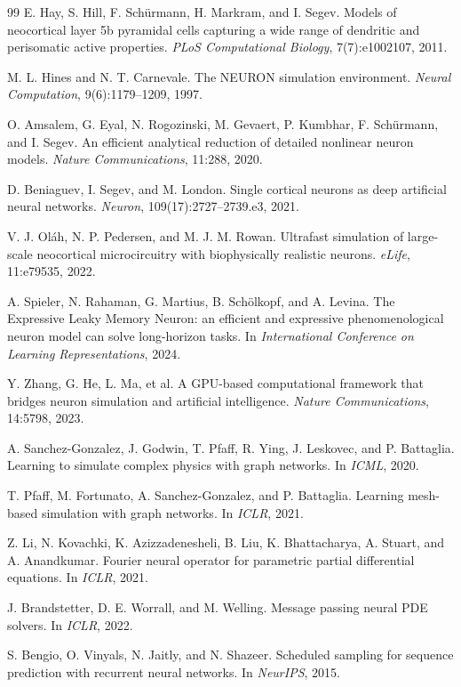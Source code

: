 \documentclass[11pt]{article}
\begin{document}
\begin{thebibliography}{99}
 E. Hay, S. Hill, F. Sch\"urmann, H. Markram, and I. Segev.
Models of neocortical layer 5b pyramidal cells capturing a wide range of
dendritic and perisomatic active properties. \emph{PLoS Computational
Biology}, 7(7):e1002107, 2011.

 M. L. Hines and N. T. Carnevale. The NEURON simulation
environment. \emph{Neural Computation}, 9(6):1179--1209, 1997.

 O. Amsalem, G. Eyal, N. Rogozinski, M. Gevaert,
P. Kumbhar, F. Sch\"urmann, and I. Segev. An efficient analytical reduction of
detailed nonlinear neuron models. \emph{Nature Communications}, 11:288, 2020.

 D. Beniaguev, I. Segev, and M. London. Single cortical
neurons as deep artificial neural networks. \emph{Neuron},
109(17):2727--2739.e3, 2021.

 V. J. Ol\'ah, N. P. Pedersen, and M. J. M. Rowan. Ultrafast
simulation of large-scale neocortical microcircuitry with biophysically
realistic neurons. \emph{eLife}, 11:e79535, 2022.

 A. Spieler, N. Rahaman, G. Martius, B. Sch\"olkopf, and
A. Levina. The Expressive Leaky Memory Neuron: an efficient and expressive
phenomenological neuron model can solve long-horizon tasks. In
\emph{International Conference on Learning Representations}, 2024.

 Y. Zhang, G. He, L. Ma, et al. A GPU-based computational
framework that bridges neuron simulation and artificial intelligence.
\emph{Nature Communications}, 14:5798, 2023.

 A. Sanchez-Gonzalez, J. Godwin, T. Pfaff, R. Ying,
J. Leskovec, and P. Battaglia. Learning to simulate complex physics with graph
networks. In \emph{ICML}, 2020.

 T. Pfaff, M. Fortunato, A. Sanchez-Gonzalez, and
P. Battaglia. Learning mesh-based simulation with graph networks. In
\emph{ICLR}, 2021.

 Z. Li, N. Kovachki, K. Azizzadenesheli, B. Liu,
K. Bhattacharya, A. Stuart, and A. Anandkumar. Fourier neural operator for
parametric partial differential equations. In \emph{ICLR}, 2021.

 J. Brandstetter, D. E. Worrall, and M. Welling.
Message passing neural PDE solvers. In \emph{ICLR}, 2022.

 S. Bengio, O. Vinyals, N. Jaitly, and N. Shazeer.
Scheduled sampling for sequence prediction with recurrent neural networks. In
\emph{NeurIPS}, 2015.
\end{thebibliography}
\end{document}
